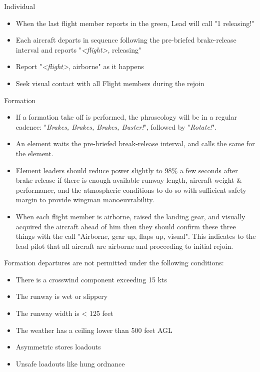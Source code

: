 Individual

\begin{itemize}

  \item When the last flight member reports in the green, Lead will call "1
    releasing!"

  \item Each aircraft departs in sequence following the pre-briefed
    brake-release interval and reports "\textit{<flight>}, releasing"

  \item Report "\textit{<flight>}, airborne" as it happens

  \item Seek visual contact with all Flight members during the rejoin

\end{itemize}

Formation

\begin{itemize}

  \item If a formation take off is performed, the phraseology will be in a
    regular cadence: "\textit{Brakes, Brakes, Brakes, Buster!}", followed by
    "\textit{Rotate!}".

  \item An element waits the pre-briefed break-release interval,
    and calls the same for the element.

  \item Element leaders should reduce power slightly to 98\% a few seconds
    after brake release if there is enough available runway length, aircraft
    weight \& performance, and the atmospheric conditions to do so with
    sufficient safety margin to provide wingman manoeuvrability.

  \item When each flight member is airborne, raised the landing gear, and
    visually acquired the aircraft ahead of him then they should confirm these
    three things with the call "Airborne, gear up, flaps up, visual". This
    indicates to the lead pilot that all aircraft are airborne and proceeding
    to initial rejoin.

\end{itemize}

Formation departures are not permitted under the following conditions:

\begin{itemize}
  \item There is a crosswind component exceeding 15 kts
  \item The runway is wet or slippery
  \item The runway width is < 125 feet
  \item The weather has a ceiling lower than 500 feet AGL
  \item Asymmetric stores loadouts
  \item Unsafe loadouts like hung ordnance
\end{itemize}

